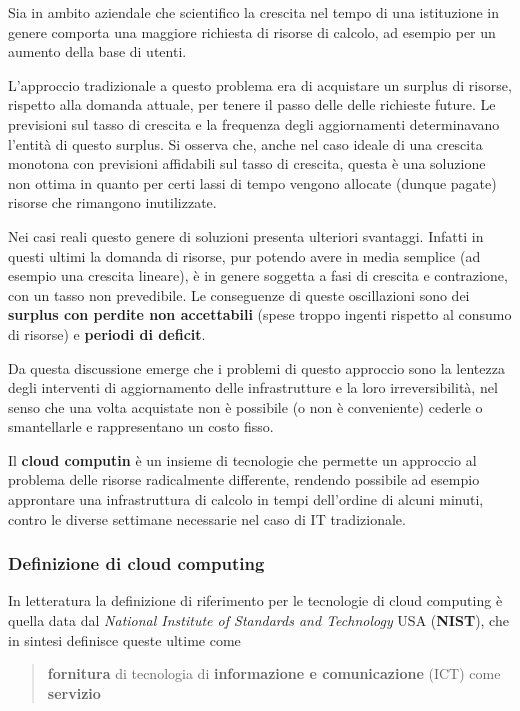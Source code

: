 \documentclass[italian,]{article}
\begin{document}
Sia in ambito aziendale che scientifico la crescita nel tempo di una
istituzione in genere comporta una maggiore richiesta di risorse di
calcolo, ad esempio per un aumento della base di utenti.

L'approccio tradizionale a questo problema era di acquistare un surplus
di risorse, rispetto alla domanda attuale, per tenere il passo delle
delle richieste future. Le previsioni sul tasso di crescita e la
frequenza degli aggiornamenti determinavano l'entità di questo surplus.
Si osserva che, anche nel caso ideale di una crescita monotona con
previsioni affidabili sul tasso di crescita, questa è una soluzione non
ottima in quanto per certi lassi di tempo vengono allocate (dunque
pagate) risorse che rimangono inutilizzate.

Nei casi reali questo genere di soluzioni presenta ulteriori svantaggi.
Infatti in questi ultimi la domanda di risorse, pur potendo avere in
media semplice (ad esempio una crescita lineare), è in genere soggetta a
fasi di crescita e contrazione, con un tasso non prevedibile. Le
conseguenze di queste oscillazioni sono dei \textbf{surplus con perdite
non accettabili} (spese troppo ingenti rispetto al consumo di risorse) e
\textbf{periodi di deficit}.

Da questa discussione emerge che i problemi di questo approccio sono la
lentezza degli interventi di aggiornamento delle infrastrutture e la
loro irreversibilità, nel senso che una volta acquistate non è possibile
(o non è conveniente) cederle o smantellarle e rappresentano un costo
fisso.

Il \textbf{cloud computin} è un insieme di tecnologie che permette un
approccio al problema delle risorse radicalmente differente, rendendo
possibile ad esempio approntare una infrastruttura di calcolo in tempi
dell'ordine di alcuni minuti, contro le diverse settimane necessarie nel
caso di IT tradizionale.

\subsubsection{Definizione di cloud
computing}\label{definizione-di-cloud-computing}

In letteratura la definizione di riferimento per le tecnologie di cloud
computing è quella data dal \emph{National Institute of Standards and
Technology} USA (\textbf{NIST}), che in sintesi definisce queste ultime
come

\begin{quote}
\textbf{fornitura} di tecnologia di \textbf{informazione e
comunicazione} (ICT) come \textbf{servizio}
\end{quote}
\end{document}

